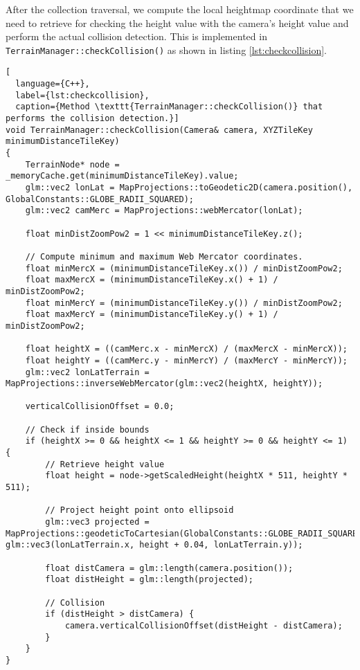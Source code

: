 After the collection traversal, we compute the local heightmap coordinate 
that we need to retrieve for checking the height value with the camera's height value
and perform the actual collision detection. This is implemented 
in \texttt{TerrainManager::checkCollision()} as shown in listing \ref{lst:checkcollision}.

\begin{lstlisting}[
  language={C++},
  label={lst:checkcollision},
  caption={Method \texttt{TerrainManager::checkCollision()} that performs the collision detection.}]
void TerrainManager::checkCollision(Camera& camera, XYZTileKey minimumDistanceTileKey)
{
    TerrainNode* node = _memoryCache.get(minimumDistanceTileKey).value;
    glm::vec2 lonLat = MapProjections::toGeodetic2D(camera.position(), GlobalConstants::GLOBE_RADII_SQUARED);
    glm::vec2 camMerc = MapProjections::webMercator(lonLat);

    float minDistZoomPow2 = 1 << minimumDistanceTileKey.z();

    // Compute minimum and maximum Web Mercator coordinates.
    float minMercX = (minimumDistanceTileKey.x()) / minDistZoomPow2;
    float maxMercX = (minimumDistanceTileKey.x() + 1) / minDistZoomPow2;
    float minMercY = (minimumDistanceTileKey.y()) / minDistZoomPow2;
    float maxMercY = (minimumDistanceTileKey.y() + 1) / minDistZoomPow2;

    float heightX = ((camMerc.x - minMercX) / (maxMercX - minMercX));
    float heightY = ((camMerc.y - minMercY) / (maxMercY - minMercY));
    glm::vec2 lonLatTerrain = MapProjections::inverseWebMercator(glm::vec2(heightX, heightY));

    verticalCollisionOffset = 0.0;

    // Check if inside bounds
    if (heightX >= 0 && heightX <= 1 && heightY >= 0 && heightY <= 1) {
        // Retrieve height value
        float height = node->getScaledHeight(heightX * 511, heightY * 511);

        // Project height point onto ellipsoid
        glm::vec3 projected = MapProjections::geodeticToCartesian(GlobalConstants::GLOBE_RADII_SQUARED, glm::vec3(lonLatTerrain.x, height + 0.04, lonLatTerrain.y));

        float distCamera = glm::length(camera.position());
        float distHeight = glm::length(projected);

        // Collision
        if (distHeight > distCamera) {
            camera.verticalCollisionOffset(distHeight - distCamera);
        }
    }
}
\end{lstlisting}
